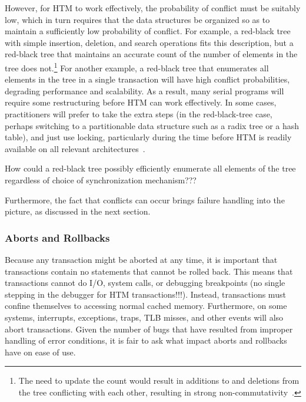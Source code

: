 However, for HTM to work effectively, the probability of conflict must
be suitably low, which in turn requires that the data structures
be organized so as to maintain a sufficiently low probability of conflict.
For example, a red-black tree with simple insertion, deletion, and search
operations fits this description, but a red-black
tree that maintains an accurate count of the number of elements in
the tree does not.\footnote{
	The need to update the count would result in additions to and
	deletions from the tree conflicting with each other, resulting
	in strong non-commutativity~\cite{HagitAttiya2011LawsOfOrder,Attiya:2011:LOE:1925844.1926442,PaulEMcKenney2011SNC}.}
For another example, a red-black tree that enumerates all elements in
the tree in a single transaction will have high conflict probabilities,
degrading performance and scalability.
As a result, many serial programs will require some restructuring before
HTM can work effectively.
In some cases, practitioners will prefer to take the extra steps
(in the red-black-tree case, perhaps switching to a partitionable
data structure such as a radix tree or a hash table), and just
use locking, particularly during the time before HTM is readily available
on all relevant
architectures~\cite{CliffClick2009AzulHTM}.

\QuickQuiz{}
	How could a red-black tree possibly efficiently enumerate all
	elements of the tree regardless of choice of synchronization
	mechanism???
 \QuickQuizEnd

Furthermore, the fact that conflicts can occur brings failure handling
into the picture, as discussed in the next section.

\subsubsection{Aborts and Rollbacks}
\label{sec:future:Aborts and Rollbacks}

Because any transaction might be aborted at any time, it is important
that transactions contain no statements that cannot be rolled back.
This means that transactions cannot do I/O, system calls, or debugging
breakpoints (no single stepping in the debugger for HTM transactions!!!).
Instead, transactions must confine themselves to accessing normal
cached memory.
Furthermore, on some systems, interrupts, exceptions, traps,
TLB misses, and other events will also abort transactions.
Given the number of bugs that have resulted from improper handling
of error conditions, it is fair to ask what impact aborts and rollbacks
have on ease of use.

